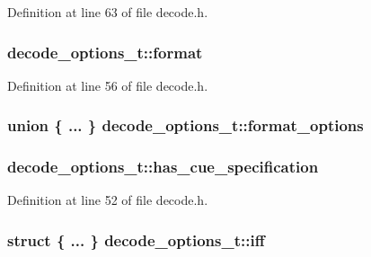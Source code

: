 Definition at line 63 of file decode.\+h.

\subsubsection[{\texorpdfstring{format}{format}}]{ decode\+\_\+options\+\_\+t\+::format}\hypertarget{structdecode__options__t_a07350a15d90fc7cdef3c2357578ebd88}{}\label{structdecode__options__t_a07350a15d90fc7cdef3c2357578ebd88}


Definition at line 56 of file decode.\+h.

\subsubsection[{\texorpdfstring{format\+\_\+options}{format_options}}]{\setlength{\rightskip}{0pt plus 5cm}union \{ ... \}   decode\+\_\+options\+\_\+t\+::format\+\_\+options}\hypertarget{structdecode__options__t_a1f9c1189f564540e7e6d32b37f4c9e95}{}\label{structdecode__options__t_a1f9c1189f564540e7e6d32b37f4c9e95}
\subsubsection[{\texorpdfstring{has\+\_\+cue\+\_\+specification}{has_cue_specification}}]{ decode\+\_\+options\+\_\+t\+::has\+\_\+cue\+\_\+specification}\hypertarget{structdecode__options__t_a090ac01d144b0c8b0ae24de42b5ec100}{}\label{structdecode__options__t_a090ac01d144b0c8b0ae24de42b5ec100}


Definition at line 52 of file decode.\+h.

\subsubsection[{\texorpdfstring{iff}{iff}}]{\setlength{\rightskip}{0pt plus 5cm}struct \{ ... \}   decode\+\_\+options\+\_\+t\+::iff}\hypertarget{structdecode__options__t_aafd974d7f74c6b9d784cae4be6fd6fd6}{}\label{structdecode__options__t_aafd974d7f74c6b9d784cae4be6fd6fd6}
